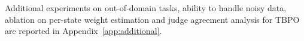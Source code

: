 \documentclass{article}
\theoremstyle{plain}
\theoremstyle{definition}
\theoremstyle{remark}
\begin{document}



Additional experiments on out-of-domain tasks, ability to handle noisy data, ablation on per-state weight estimation and judge agreement analysis for TBPO are reported in Appendix~\ref{app:additional}.
\end{document}
